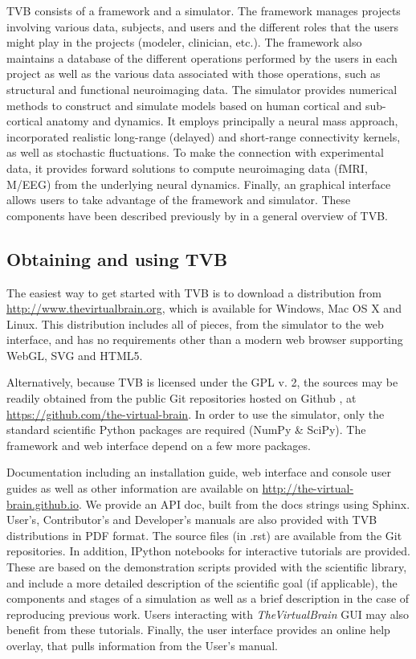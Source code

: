 \documentclass{bioinfo}
\newcommand{\TVB}{\textit{TheVirtualBrain }}
\begin{document}
TVB consists of a framework and a simulator. 
The framework manages projects involving various data, subjects, and users
and the different roles that the users might play in the projects (modeler, 
clinician, etc.). The framework also maintains a database of the different
operations performed by the users in each project as well as the various
data associated with those operations, such as structural and functional
neuroimaging data.
The simulator provides numerical methods to construct and simulate models
based on human cortical and sub-cortical anatomy and dynamics. It employs principally
a neural mass approach, incorporated realistic long-range (delayed) and
short-range connectivity kernels, as well as stochastic fluctuations. 
To make the connection with experimental data, it provides forward solutions to
compute neuroimaging data (fMRI, M/EEG) from the underlying neural dynamics. 
Finally, an graphical interface allows users to take advantage of the framework
and simulator. These components have been described previously by 
\citeauthor{Sanz-Leon_2013} \citeyear{Sanz-Leon_2013} in a general overview
of TVB.

\subsection{Obtaining and using TVB}

The easiest way to get started with TVB is to download a distribution
from \url{http://www.thevirtualbrain.org}, which is available for Windows,
Mac OS X and Linux. This distribution includes
all of pieces, from the simulator to the web interface, and has no
requirements other than a modern web browser supporting WebGL, SVG and
HTML5.

Alternatively, because TVB is licensed under the GPL v. 2, the sources may be
readily obtained from the public Git repositories hosted on Github
\citep{dabbish2012social}, at 
\url{https://github.com/the-virtual-brain}. In order to use the simulator, 
only the standard scientific Python packages are required (NumPy \& SciPy).
The framework and web interface depend on a few more packages. 

Documentation including an installation guide, web interface and console 
user guides as well as other information are available on 
\url{http://the-virtual-brain.github.io}.
We provide an API doc, built from the docs strings using Sphinx.
User's, Contributor's and Developer's manuals are also provided with TVB
distributions in PDF format. The source files (in .rst) are available
from the Git repositories.
In addition, IPython notebooks \citep{PerezGranger_2007}
for interactive tutorials are provided. These are based on the
demonstration scripts provided with the scientific library, and
include a more detailed description of the scientific goal (if
applicable), the components and stages of a simulation as well as a
brief description in the case of reproducing previous work. Users
interacting with \TVB GUI may also benefit from these tutorials.
Finally, the user interface provides an online help overlay, that pulls
information from the User's manual.
\end{document}

